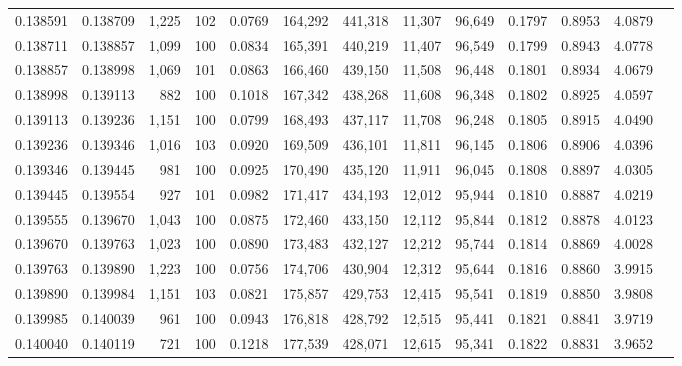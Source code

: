 \begin{tabular}{rrrrrrrrrrrrr}
0.138591 & 0.138709 & 1,225 & 102 &                                     0.0769 & 164,292 & 441,318 &  11,307 &  96,649 & 0.1797 & 0.8953 & 4.0879 \\
0.138711 & 0.138857 & 1,099 & 100 &                                     0.0834 & 165,391 & 440,219 &  11,407 &  96,549 & 0.1799 & 0.8943 & 4.0778 \\
0.138857 & 0.138998 & 1,069 & 101 &                                     0.0863 & 166,460 & 439,150 &  11,508 &  96,448 & 0.1801 & 0.8934 & 4.0679 \\
0.138998 & 0.139113 &   882 & 100 &                                     0.1018 & 167,342 & 438,268 &  11,608 &  96,348 & 0.1802 & 0.8925 & 4.0597 \\
0.139113 & 0.139236 & 1,151 & 100 &                                     0.0799 & 168,493 & 437,117 &  11,708 &  96,248 & 0.1805 & 0.8915 & 4.0490 \\
0.139236 & 0.139346 & 1,016 & 103 &                                     0.0920 & 169,509 & 436,101 &  11,811 &  96,145 & 0.1806 & 0.8906 & 4.0396 \\
0.139346 & 0.139445 &   981 & 100 &                                     0.0925 & 170,490 & 435,120 &  11,911 &  96,045 & 0.1808 & 0.8897 & 4.0305 \\
0.139445 & 0.139554 &   927 & 101 &                                     0.0982 & 171,417 & 434,193 &  12,012 &  95,944 & 0.1810 & 0.8887 & 4.0219 \\
0.139555 & 0.139670 & 1,043 & 100 &                                     0.0875 & 172,460 & 433,150 &  12,112 &  95,844 & 0.1812 & 0.8878 & 4.0123 \\
0.139670 & 0.139763 & 1,023 & 100 &                                     0.0890 & 173,483 & 432,127 &  12,212 &  95,744 & 0.1814 & 0.8869 & 4.0028 \\
0.139763 & 0.139890 & 1,223 & 100 &                                     0.0756 & 174,706 & 430,904 &  12,312 &  95,644 & 0.1816 & 0.8860 & 3.9915 \\
0.139890 & 0.139984 & 1,151 & 103 &                                     0.0821 & 175,857 & 429,753 &  12,415 &  95,541 & 0.1819 & 0.8850 & 3.9808 \\
0.139985 & 0.140039 &   961 & 100 &                                     0.0943 & 176,818 & 428,792 &  12,515 &  95,441 & 0.1821 & 0.8841 & 3.9719 \\
0.140040 & 0.140119 &   721 & 100 &                                     0.1218 & 177,539 & 428,071 &  12,615 &  95,341 & 0.1822 & 0.8831 & 3.9652 \\

\end{tabular}
